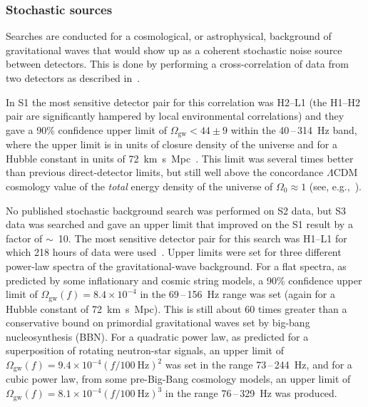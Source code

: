 \subsubsection{Stochastic sources}


Searches are conducted for a cosmological, or astrophysical, background of
gravitational waves that would show up as a coherent stochastic noise source
between detectors. This is done by performing a cross-correlation of data from
two detectors as described in~\cite{Allen:1999b}.


In S1 the most sensitive detector pair for this correlation was H2--L1 (the H1--H2
pair are significantly hampered by local environmental correlations) and they
gave a 90\% confidence upper limit of $\Omega_{\mathrm{gw}} < 44\pm9$ within the 40\,--\,314~Hz band, where the upper limit is in
units of closure density of the universe and for a Hubble constant in units of
72~km~s~Mpc~\cite{Abbott:2004e}. This limit was several times
better than previous direct-detector limits, but still well above the
concordance $\Lambda$CDM cosmology value of the \textit{total} energy density of
the universe of $\Omega_0\approx1$ (see, e.g.,~\cite{Jarosik:2010}).


No published stochastic background search was performed on S2 data, but S3 data
was searched and gave an upper limit that improved on the S1 result by a factor
of $\sim$~10. The most sensitive detector pair for this search was H1--L1 for
which 218 hours of data were used~\cite{Abbott:2005h}. Upper limits were set for
three different power-law spectra of the gravitational-wave background. For a
flat spectra, as predicted by some inflationary and cosmic string models, a 90\%
confidence upper limit of $\Omega_{\mathrm{gw}}(f) = 8.4\times10^{-4}$ in the
69\,--\,156~Hz range was set (again for a Hubble constant of
72~km~s~Mpc). This is still about 60 times greater than a
conservative bound on primordial gravitational waves set by big-bang
nucleosynthesis (BBN). For a quadratic power law, as predicted for a
superposition of rotating neutron-star signals, an upper limit of
$\Omega_{\mathrm{gw}}(f) = 9.4\times10^{-4}(f/100 \mathrm{\ Hz})^2$ was set in the range 73\,--\,244~Hz,
and for a cubic power law, from some pre-Big-Bang cosmology models, an upper
limit of $\Omega_{\mathrm{gw}}(f) = 8.1\times10^{-4}(f/100 \mathrm{\ Hz})^3$ in the range
76\,--\,329~Hz was produced.



